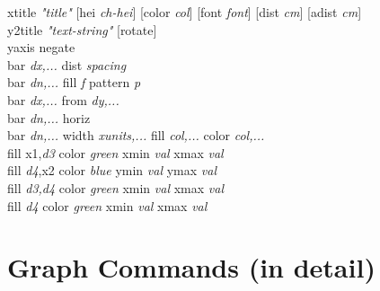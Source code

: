 {\sf xtitle {\it "title"} [hei {\it ch-hei}] [color {\it col}] [font {\it font}] [dist {\it cm}] [adist {\it cm}]}   \\
{\sf y2title {\it "text-string"}  [rotate]  }  \\
{\sf yaxis negate}  \\
{\sf bar {\it dx,...} dist {\it spacing}}\\
{\sf bar {\it dn,...} fill {\it f} pattern {\it p}} \\
{\sf bar {\it dx,...} from {\it dy,...}}\\
{\sf bar {\it dn,...} horiz} \\
{\sf bar {\it dn,...} width {\it xunits,...} fill {\it col,...} color {\it col,...} }\\
{\sf fill x1,{\it d3} color {\it green}  xmin {\it val} xmax {\it val}} \\
{\sf fill {\it d4},x2 color {\it blue}   ymin {\it val} ymax {\it val}} \\
{\sf fill {\it d3,d4} color {\it green}  xmin {\it val} xmax {\it val}} \\
{\sf fill {\it d4} color {\it green}  xmin {\it val} xmax {\it val}} \\


\section{Graph Commands (in detail)}

